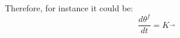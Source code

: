 Therefore, for instance it could be:
\begin{equation}
\frac{d \theta^f}{dt} = K \vec{}{}
\end{equation}
